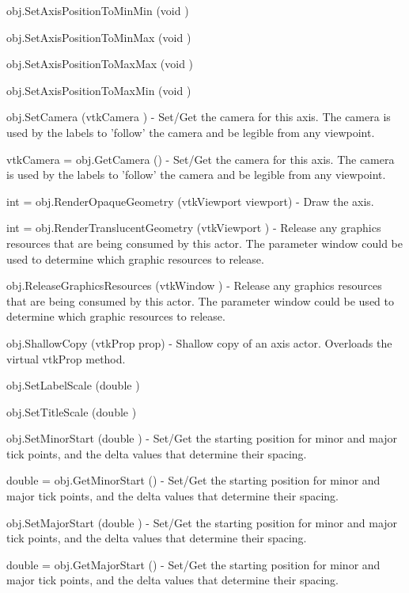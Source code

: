 \begin{DoxyItemize}
\item {\ttfamily obj.\-Set\-Axis\-Position\-To\-Min\-Min (void )}  
\item {\ttfamily obj.\-Set\-Axis\-Position\-To\-Min\-Max (void )}  
\item {\ttfamily obj.\-Set\-Axis\-Position\-To\-Max\-Max (void )}  
\item {\ttfamily obj.\-Set\-Axis\-Position\-To\-Max\-Min (void )}  
\item {\ttfamily obj.\-Set\-Camera (vtk\-Camera )} -\/ Set/\-Get the camera for this axis. The camera is used by the labels to 'follow' the camera and be legible from any viewpoint.  
\item {\ttfamily vtk\-Camera = obj.\-Get\-Camera ()} -\/ Set/\-Get the camera for this axis. The camera is used by the labels to 'follow' the camera and be legible from any viewpoint.  
\item {\ttfamily int = obj.\-Render\-Opaque\-Geometry (vtk\-Viewport viewport)} -\/ Draw the axis.  
\item {\ttfamily int = obj.\-Render\-Translucent\-Geometry (vtk\-Viewport )} -\/ Release any graphics resources that are being consumed by this actor. The parameter window could be used to determine which graphic resources to release.  
\item {\ttfamily obj.\-Release\-Graphics\-Resources (vtk\-Window )} -\/ Release any graphics resources that are being consumed by this actor. The parameter window could be used to determine which graphic resources to release.  
\item {\ttfamily obj.\-Shallow\-Copy (vtk\-Prop prop)} -\/ Shallow copy of an axis actor. Overloads the virtual vtk\-Prop method.  
\item {\ttfamily obj.\-Set\-Label\-Scale (double )}  
\item {\ttfamily obj.\-Set\-Title\-Scale (double )}  
\item {\ttfamily obj.\-Set\-Minor\-Start (double )} -\/ Set/\-Get the starting position for minor and major tick points, and the delta values that determine their spacing.  
\item {\ttfamily double = obj.\-Get\-Minor\-Start ()} -\/ Set/\-Get the starting position for minor and major tick points, and the delta values that determine their spacing.  
\item {\ttfamily obj.\-Set\-Major\-Start (double )} -\/ Set/\-Get the starting position for minor and major tick points, and the delta values that determine their spacing.  
\item {\ttfamily double = obj.\-Get\-Major\-Start ()} -\/ Set/\-Get the starting position for minor and major tick points, and the delta values that determine their spacing.  

\end{DoxyItemize}
